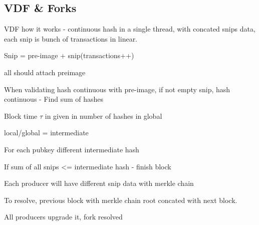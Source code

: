 \documentclass[../Bitcoin Blink.tex]{subfiles}
\begin{document}
\normalsize
\subsection{VDF \& Forks }

VDF how it works - continuous hash in a single thread, with concated snips data, each snip is bunch of transactions in linear.

Snip = pre-image + snip(transactions++)

all should attach preimage

When validating hash continuous with pre-image, if not empty snip, hash continuous - Find sum of hashes

Block time $\tau$ in given in number of hashes in global

local/global = intermediate

For each pubkey different intermediate hash

If sum of all snips <= intermediate hash - finish block

Each producer will have different snip data with merkle chain

To resolve, previous block with merkle chain root concated with next block.

All producers upgrade it, fork resolved
\end{document}
